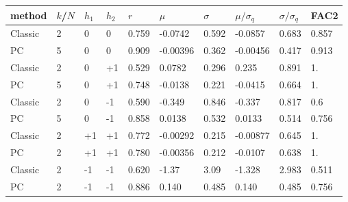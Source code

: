 \begin{tabular}{|llll|lll|lll|}
	\hline
method & $k$/$N$ & $h_1$ & $h_2$ & $r$ & $\mu$ & $\sigma$ & $\mu/\sigma_q$ & $\sigma/\sigma_q$ & FAC2 \\\hline\hline
	Classic & 2 &  0 & 0 & 0.759 & -0.0742 & 0.592 & -0.0857 & 0.683 & 0.857 \\
	PC & 5 & 0 & 0 & 0.909 & -0.00396 & 0.362 & -0.00456 & 0.417 & 0.913 \\
	\hline
	Classic & 2 & 0 & +1 & 0.529 & 0.0782 & 0.296 & 0.235 & 0.891 & 1. \\
	PC & 5 & 0 & +1 & 0.748 & -0.0138 & 0.221 & -0.0415 & 0.664 & 1. \\
	\hline
	Classic & 2 & 0 & -1 & 0.590 & -0.349 & 0.846 & -0.337 & 0.817 & 0.6 \\
	PC & 5 &  0 & -1 & 0.858 & 0.0138 & 0.532 & 0.0133 & 0.514 & 0.756 \\
	\hline
	Classic & 2 & +1 & +1 & 0.772 & -0.00292 & 0.215 & -0.00877 & 0.645 & 1. \\
	PC & 2 & +1 & +1 & 0.780 & -0.00356 & 0.212 & -0.0107 & 0.638 & 1. \\
	\hline
	Classic & 2 & -1 & -1 & 0.620 & -1.37 & 3.09 & -1.328 & 2.983 & 0.511 \\
	PC & 2 & -1 & -1 & 0.886 & 0.140 & 0.485 & 0.140 & 0.485 & 0.756 \\
	\hline
\end{tabular}


